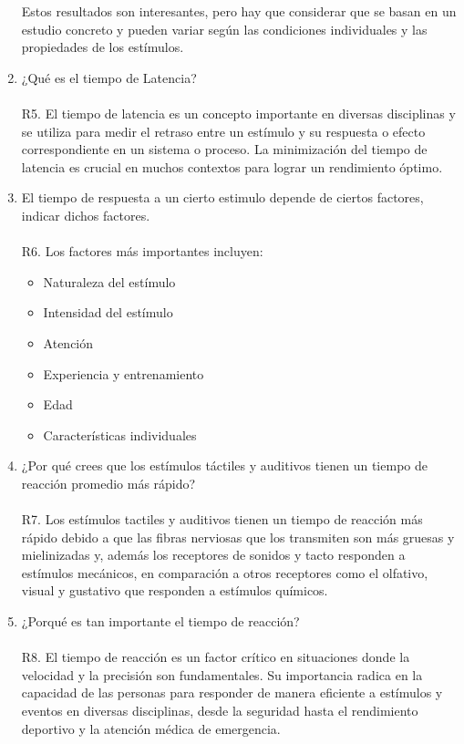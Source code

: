 \documentclass[11pt]{article}
\begin{document}
\begin{multicols}{2}
\begin{enumerate}
            Estos resultados son interesantes, pero hay que considerar que se basan en un estudio concreto y pueden variar según las condiciones individuales y las propiedades de los estímulos.
            \item ¿Qué es el tiempo de Latencia?\\\\
            R5. El tiempo de latencia es un concepto importante en diversas disciplinas y se utiliza para medir el retraso entre un estímulo y su respuesta o efecto correspondiente en un sistema o proceso. La minimización del tiempo de latencia es crucial en muchos contextos para lograr un rendimiento óptimo.
            \item El tiempo de respuesta a un cierto estimulo depende de ciertos factores, indicar dichos factores.\\\\
            R6. Los factores más importantes incluyen:
            \begin{itemize}
                \item Naturaleza del estímulo
                \item Intensidad del estímulo
                \item Atención
                \item Experiencia y entrenamiento
                \item Edad
                \item Características individuales
            \end{itemize}
            \item ¿Por qué crees que los estímulos táctiles y auditivos tienen un tiempo de reacción promedio más rápido?\\\\
            R7. Los estímulos tactiles y auditivos tienen un tiempo de reacción más rápido debido a que las fibras nerviosas que los transmiten son más gruesas y mielinizadas y, además los receptores de sonidos y tacto responden a estímulos mecánicos, en comparación a otros receptores como el olfativo, visual y gustativo que responden a estímulos químicos.
            \item ¿Porqué es tan importante el tiempo de reacción?\\\\
            R8. El tiempo de reacción es un factor crítico en situaciones donde la velocidad y la precisión son fundamentales. Su importancia radica en la capacidad de las personas para responder de manera eficiente a estímulos y eventos en diversas disciplinas, desde la seguridad hasta el rendimiento deportivo y la atención médica de emergencia.

\end{enumerate}
\end{multicols}
\end{document}
